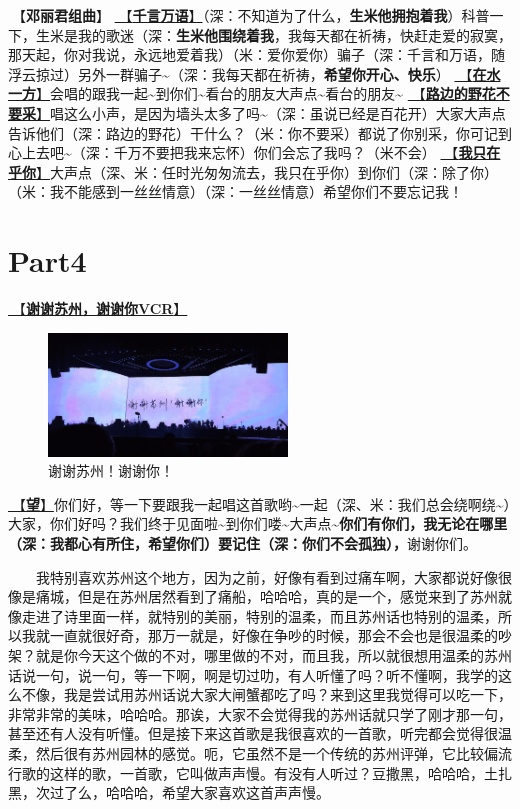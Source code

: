 \documentclass[]{ctexbook}
\begin{document}
🎵【\textbf{邓丽君组曲}】
\hyperref[thousands-of-words]{🎵【\textbf{千言万语}】}（深：不知道为了什么，\textbf{生米他拥抱着我}）科普一下，生米是我的歌迷（深：\textbf{生米他围绕着我}，我每天都在祈祷，快赶走爱的寂寞，那天起，你对我说，永远地爱着我）（米：爱你爱你）骗子（深：千言和万语，随浮云掠过）另外一群骗子\textasciitilde（深：我每天都在祈祷，\textbf{希望你开心、快乐}）
\hyperref[on-the-water-side]{🎵【\textbf{在水一方}】}会唱的跟我一起\textasciitilde 到你们\textasciitilde 看台的朋友大声点\textasciitilde 看台的朋友\textasciitilde{}
\hyperref[only-with-me]{🎵【\textbf{路边的野花不要采}】}唱这么小声，是因为墙头太多了吗\textasciitilde（深：虽说已经是百花开）大家大声点告诉他们（深：路边的野花）干什么？（米：你不要采）都说了你别采，你可记到心上去吧\textasciitilde（深：千万不要把我来忘怀）你们会忘了我吗？（米不会）
\hyperref[only-you]{🎵【\textbf{我只在乎你}】}大声点（深、米：任时光匆匆流去，我只在乎你）到你们（深：除了你）（米：我不能感到一丝丝情意）（深：一丝丝情意）希望你们不要忘记我！

\section{Part4}\label{suzhou-20241109-part4}

\hyperref[thank-you-vcr]{🎥【\textbf{谢谢苏州，谢谢你VCR}】}

\begin{figure}

{\centering \includegraphics[width=180pt]{img/suzhou20241109/thank-suzhou} 

}

\caption{谢谢苏州！谢谢你！}\label{fig:unnamed-chunk-107}
\end{figure}

\hyperref[hope]{🎵【\textbf{望}】}你们好，等一下要跟我一起唱这首歌哟\textasciitilde 一起（深、米：我们总会绕啊绕\textasciitilde）大家，你们好吗？我们终于见面啦\textasciitilde 到你们喽\textasciitilde 大声点\textasciitilde{}\textbf{你们有你们，我无论在哪里（深：我都心有所住，希望你们）要记住（深：你们不会孤独），}谢谢你们。

  我特别喜欢苏州这个地方，因为之前，好像有看到过痛车啊，大家都说好像很像是痛城，但是在苏州居然看到了痛船，哈哈哈，真的是一个，感觉来到了苏州就像走进了诗里面一样，就特别的美丽，特别的温柔，而且苏州话也特别的温柔，所以我就一直就很好奇，那万一就是，好像在争吵的时候，那会不会也是很温柔的吵架？就是你今天这个做的不对，哪里做的不对，而且我，所以就很想用温柔的苏州话说一句，说一句，等一下啊，啊是切过叻，有人听懂了吗？听不懂啊，我学的这么不像，我是尝试用苏州话说大家大闸蟹都吃了吗？来到这里我觉得可以吃一下，非常非常的美味，哈哈哈。那诶，大家不会觉得我的苏州话就只学了刚才那一句，甚至还有人没有听懂。但是接下来这首歌是我很喜欢的一首歌，听完都会觉得很温柔，然后很有苏州园林的感觉。呃，它虽然不是一个传统的苏州评弹，它比较偏流行歌的这样的歌，一首歌，它叫做声声慢。有没有人听过？豆撒黑，哈哈哈，土扎黑，次过了么，哈哈哈，希望大家喜欢这首声声慢。
\end{document}
